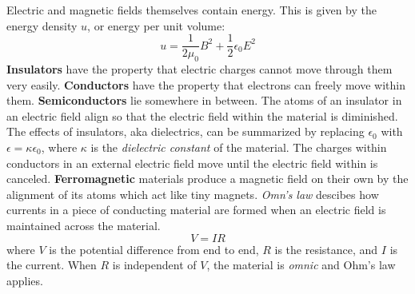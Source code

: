     Electric and magnetic fields themselves contain energy. This is given by the energy density $u$, or energy per unit volume:
    \begin{equation*}
        u = \frac{1}{2\mu_0}B^2 + \frac{1}{2}\epsilon_0E^2
    \end{equation*}
    \textbf{Insulators} have the property that electric charges cannot move through them very easily. \textbf{Conductors} have the property that electrons can freely move within them. \textbf{Semiconductors} lie somewhere in between. 
    \newline \indent
    The  atoms of an insulator in an electric field align so that the electric field within the material is diminished. The effects of insulators, aka dielectrics, can be summarized by replacing $\epsilon_0$ with $\epsilon = \kappa\epsilon_0$, where $\kappa$ is the \textit{dielectric constant} of the material. The charges within conductors in an external electric field move until the electric field within is canceled. \textbf{Ferromagnetic} materials produce a magnetic field on their own by the alignment of its atoms which act like tiny magnets.
    \newline \indent
    \textit{Omn's law} descibes how currents in a piece of conducting material are formed when an electric field is maintained across the material.
    \begin{equation*}
        V = IR
    \end{equation*}
    where $V$ is the potential difference from end to end, $R$ is the resistance, and $I$ is the current. When $R$ is independent of $V$, the material is \textit{omnic} and Ohm's law applies.